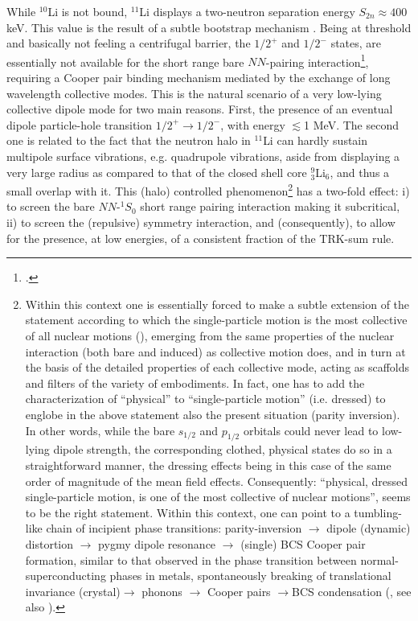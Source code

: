 While $^{10}$Li is not bound, $^{11}$Li displays a two-neutron separation energy $S_{2n}\approx400$ keV.  This value  is the result of a subtle bootstrap mechanism 
. Being at threshold and basically not feeling a centrifugal barrier, the $1/2^+$ and $1/2^-$ states, are essentially not available for the short range bare $NN$-pairing interaction\footnote{\cite{Bennaceur:00,Hamamoto:03,Hamamoto:04}.}, requiring a Cooper pair binding mechanism mediated by  the exchange of  long wavelength collective modes. This is the natural scenario of a very low-lying collective dipole mode for two main reasons. First, the presence of an eventual dipole particle-hole transition $1/2^+\rightarrow 1/2^-$, with energy  $\lesssim$1 MeV. The second one is related to  the fact that the neutron halo in $^{11}$Li can hardly sustain multipole surface vibrations, e.g. quadrupole vibrations, aside from displaying a very large radius as compared to that of the closed shell core $^9_3$Li$_6$, and thus a small overlap with it. This (halo)  controlled phenomenon\footnote{Within this context one is essentially forced to make a subtle  extension of the statement according to which  the single-particle motion is the most collective  
of all nuclear motions (\cite{Mottelson:62}), emerging from  the same properties  of the nuclear interaction 
(both bare and induced) as collective motion does, 
and in turn at the basis of the detailed properties of each collective mode, acting as
 scaffolds and filters of the variety of embodiments. In fact, one 
has  to add the characterization of ``physical'' to ``single-particle motion'' (i.e. dressed) to englobe in  the above statement 
also the present  situation (parity inversion). In other words, while the bare $s_{1/2}$ and $p_{1/2}$ orbitals could never lead to  low-lying dipole strength, the corresponding 
 clothed, physical states do so in a straightforward manner, the dressing effects being in this case of the same order of magnitude of the mean field effects. Consequently: ``physical,  dressed single-particle motion, is 
 one of the most collective of nuclear  motions'', seems to be  the right statement. Within this context, one can point to a tumbling-like chain of incipient phase transitions: parity-inversion $\to$ dipole (dynamic) distortion $\to$ pygmy dipole resonance $\to$ (single) BCS Cooper pair formation, similar to that observed in the phase transition between normal-superconducting phases in metals, spontaneously breaking of translational invariance (crystal)$\to$ phonons $\to$ Cooper pairs $\to$BCS condensation (\cite{Nambu:91}, see also \cite{Broglia:19}).} has a two-fold effect: i) to screen the bare $NN$-$^1S_0$ short  range pairing interaction making it subcritical, ii) to screen the (repulsive) symmetry interaction, and (consequently), to allow for the presence, at low energies, of a consistent fraction of the TRK-sum rule.


